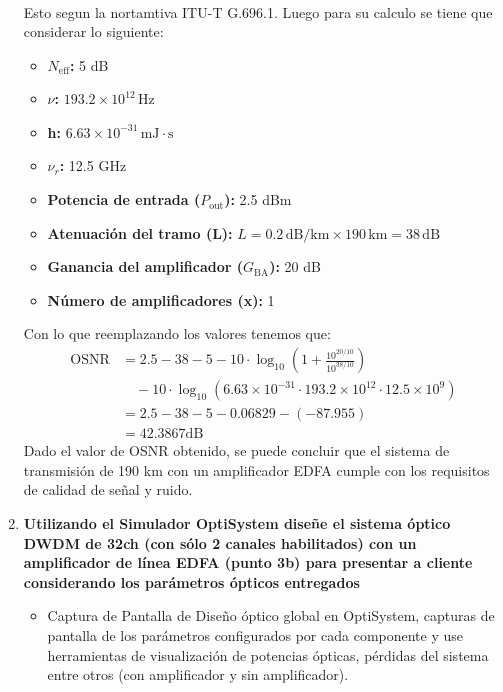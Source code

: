\begin{enumerate}
\begin{align}
		\end{align}
		Esto segun la nortamtiva ITU-T G.696.1. Luego para su calculo se tiene que considerar lo siguiente:
		\begin{itemize}
			\item \textbf{\( N_{\text{eff}} \):} 5 dB
			\item \textbf{\( \nu \):} \( 193.2 \times 10^{12} \, \text{Hz} \)
			\item \textbf{h:} \( 6.63 \times 10^{-31} \, \text{mJ} \cdot \text{s} \)
			\item \textbf{\( \nu_{r} \):} 12.5 GHz
			\item \textbf{Potencia de entrada (\( P_{\text{out}} \)):} 2.5 dBm
			\item \textbf{Atenuación del tramo (L):} \( L = 0.2 \, \text{dB/km} \times 190 \, \text{km} = 38 \, \text{dB} \)
			\item \textbf{Ganancia del amplificador (\( G_{\text{BA}} \)):} 20 dB
			\item \textbf{Número de amplificadores (x):} 1
		\end{itemize}
		Con lo que reemplazando los valores tenemos que:
		\begin{align}
			\text{OSNR} &= 2.5 - 38 - 5 - 10 \cdot \log_{10} \left( 1 + \frac{10^{20/10}}{10^{38/10}} \right) \\
			&\quad - 10 \cdot \log_{10}(6.63 \times 10^{-31} \cdot 193.2 \times 10^{12} \cdot 12.5 \times 10^{9}) \\
			&= 2.5 - 38 - 5 - 0.06829 - (-87.955)\\
			&= 42.3867 \text{dB}
		\end{align}
		Dado el valor de OSNR obtenido, se puede concluir que el sistema de transmisión de 190 km con un amplificador EDFA cumple con los requisitos de calidad de señal y ruido.
		\item \textbf{Utilizando el Simulador OptiSystem diseñe el sistema óptico DWDM de 32ch (con sólo 2 canales habilitados) con un amplificador de línea EDFA (punto 3b) para presentar a cliente considerando los parámetros ópticos entregados}
		\begin{itemize}
			\item Captura de Pantalla de Diseño óptico global en OptiSystem, capturas de pantalla de los parámetros configurados por cada componente y use herramientas de visualización de potencias ópticas, pérdidas del sistema entre otros (con amplificador y sin amplificador).

\end{itemize}
\end{enumerate}
